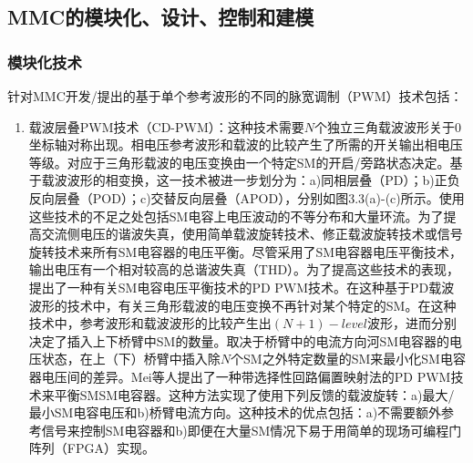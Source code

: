   \subsection{MMC的模块化、设计、控制和建模}
  
  \subsubsection{模块化技术}
  
  针对MMC开发/提出的基于单个参考波形的不同的脉宽调制（PWM）技术包括：
  \begin{enumerate}[1)]
  \item 载波层叠PWM技术（CD-PWM）：这种技术需要$N$个独立三角载波波形关于$0$坐标轴对称出现。相电压参考波形和载波的比较产生了所需的开关输出相电压等级。对应于三角形载波的电压变换由一个特定SM的开启/旁路状态决定。基于载波波形的相变换，这一技术被进一步划分为：a)同相层叠（PD）；b)正负反向层叠（POD）；c)交替反向层叠（APOD），分别如图3.3(a)-(c)所示。使用这些技术的不足之处包括SM电容上电压波动的不等分布和大量环流。为了提高交流侧电压的谐波失真，使用简单载波旋转技术、修正载波旋转技术或信号旋转技术来所有SM电容器的电压平衡。尽管采用了SM电容器电压平衡技术，输出电压有一个相对较高的总谐波失真（THD）。为了提高这些技术的表现，提出了一种有关SM电容电压平衡技术的PD PWM技术。在这种基于PD载波波形的技术中，有关三角形载波的电压变换不再针对某个特定的SM。在这种技术中，参考波形和载波波形的比较产生出$(N+1)-level$波形，进而分别决定了插入上下桥臂中SM的数量。取决于桥臂中的电流方向河SM电容器的电压状态，在上（下）桥臂中插入除$N$个SM之外特定数量的SM来最小化SM电容器电压间的差异。Mei等人提出了一种带选择性回路偏置映射法的PD PWM技术来平衡SMSM电容器。这种方法实现了使用下列反馈的载波旋转：a)最大/最小SM电容电压和b)桥臂电流方向。这种技术的优点包括：a)不需要额外参考信号来控制SM电容器和b)即便在大量SM情况下易于用简单的现场可编程门阵列（FPGA）实现。
\begin{figure}[h]
\begin{minipage}[t]{0.5\linewidth}
\centering

\end{minipage}
\end{figure}
\end{enumerate}
